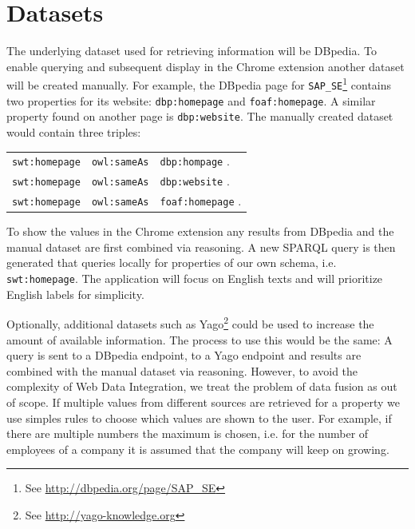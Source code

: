 \documentclass[11pt,titlepage,oneside,openany]{article}
\begin{document}
\section{Datasets}
The underlying dataset used for retrieving information will be
DBpedia. To enable querying and
subsequent display in the Chrome extension another dataset will be created manually.
For example, the DBpedia page for 
\texttt{SAP\_SE}\footnote{See \url{http://dbpedia.org/page/SAP\_SE}} contains
two properties for its website: \texttt{dbp:homepage} and \texttt{foaf:homepage}.
A similar property found on another page is \texttt{dbp:website}. The manually
created dataset would contain three triples:
\begin{center}
\begin{tabular}{lll}
\texttt{swt:homepage} & \texttt{owl:sameAs} & \texttt{dbp:hompage} .   \\
\texttt{swt:homepage} & \texttt{owl:sameAs} & \texttt{dbp:website} .   \\
\texttt{swt:homepage} & \texttt{owl:sameAs} & \texttt{foaf:homepage} .
\end{tabular}
\end{center}

To show the values in the Chrome extension any results from DBpedia and the
manual dataset are first combined via reasoning. A new SPARQL query is then
generated that queries locally for properties of our own schema, i.e.
\texttt{swt:homepage}. The application will focus on English texts and will
prioritize English labels for simplicity.

Optionally, additional datasets such as
Yago\footnote{See \url{http://yago-knowledge.org}} could be used to increase the
amount of available information. The process to use this would be the same: A query is sent to a DBpedia endpoint, to a Yago
endpoint and results are combined with the manual dataset via reasoning. 
However, to avoid the complexity of Web Data Integration, we treat the problem of data fusion as out of scope. If multiple values from different sources are
retrieved for a property we use simples rules to choose which values are shown
to the user. For example, if there are multiple numbers the maximum
is chosen, i.e. for the number of employees of a company it is assumed that the
company will keep on growing.

\end{document}
